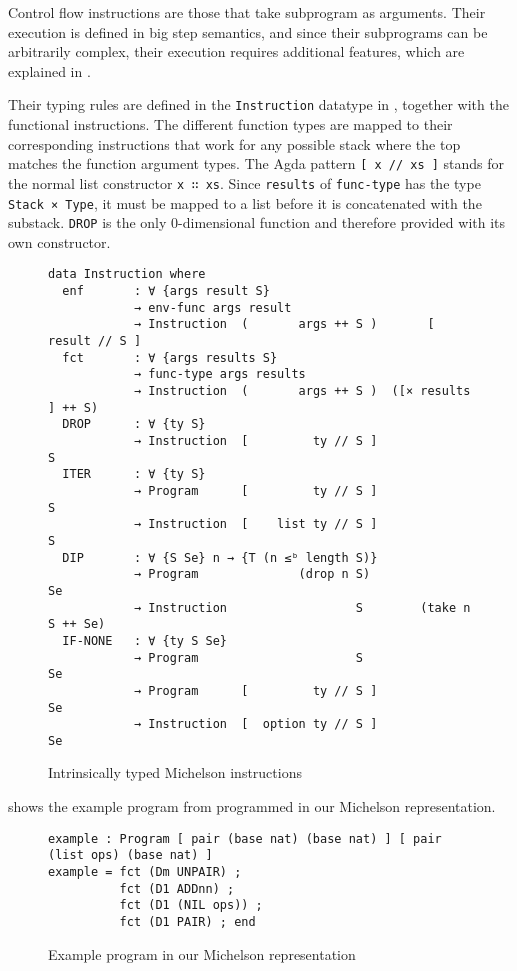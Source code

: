 Control flow instructions are those that take subprogram as arguments.
Their execution is defined in big step semantics,
and since their subprograms can be arbitrarily complex,
their execution requires additional features, which are explained in .

Their typing rules are defined in the \verb/Instruction/ datatype in ,
together with the functional instructions.
The different function types are mapped to their corresponding instructions
that work for any possible stack where the top matches the function argument types.
The Agda pattern \verb|[ x // xs ]| stands for the normal list constructor \verb/x ∷ xs/.
Since \verb/results/ of \verb/func-type/ has the type \verb/Stack × Type/,
it must be mapped to a list before it is concatenated with the substack.
\verb/DROP/ is the only 0-dimensional function and therefore provided with its own constructor.

\begin{figure}[tp]
\begin{verbatim}
data Instruction where
  enf       : ∀ {args result S}
            → env-func args result
            → Instruction  (       args ++ S )       [ result // S ]
  fct       : ∀ {args results S}
            → func-type args results
            → Instruction  (       args ++ S )  ([× results ] ++ S)
  DROP      : ∀ {ty S}
            → Instruction  [         ty // S ]                   S
  ITER      : ∀ {ty S}
            → Program      [         ty // S ]                   S
            → Instruction  [    list ty // S ]                   S
  DIP       : ∀ {S Se} n → {T (n ≤ᵇ length S)}
            → Program              (drop n S)                    Se
            → Instruction                  S        (take n S ++ Se)
  IF-NONE   : ∀ {ty S Se}
            → Program                      S                     Se
            → Program      [         ty // S ]                   Se
            → Instruction  [  option ty // S ]                   Se
\end{verbatim}
\caption{Intrinsically typed Michelson instructions}
\label{Instruction}
\end{figure}

 shows the example program from 
programmed in our Michelson representation.
\begin{figure}[tp]
\begin{verbatim}
example : Program [ pair (base nat) (base nat) ] [ pair (list ops) (base nat) ]
example = fct (Dm UNPAIR) ;
          fct (D1 ADDnn) ;
          fct (D1 (NIL ops)) ;
          fct (D1 PAIR) ; end
\end{verbatim}
\caption{Example program in our Michelson representation}
\label{simple-example-our}
\end{figure}


